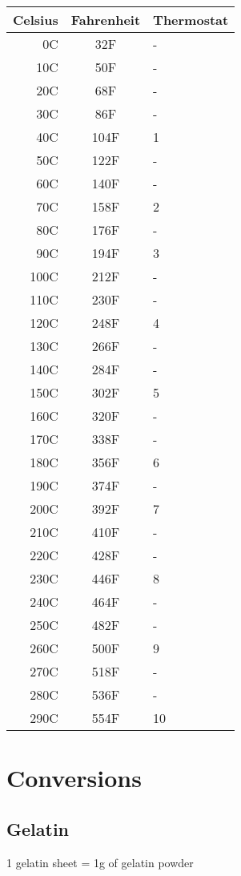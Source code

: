 \documentclass[10pt]{book}
\begin{document}
\begin{center}
\begin{tabular}{r c l}
Celsius & Fahrenheit & Thermostat \\
\hline
0C & 32F & - \\
10C & 50F & - \\
20C & 68F & - \\
30C & 86F & - \\
40C & 104F & 1 \\
50C & 122F & - \\
60C & 140F & - \\
70C & 158F & 2 \\
80C & 176F & - \\
90C & 194F & 3 \\
\hline
100C & 212F & - \\
110C & 230F & - \\
120C & 248F & 4 \\
130C & 266F & - \\
140C & 284F & - \\
150C & 302F & 5 \\
160C & 320F & - \\
170C & 338F & - \\
180C & 356F & 6 \\
190C & 374F & - \\
\hline
200C & 392F & 7 \\
210C & 410F & - \\
220C & 428F & - \\
230C & 446F & 8 \\
240C & 464F & - \\
250C & 482F & - \\
260C & 500F & 9 \\
270C & 518F & - \\
280C & 536F & - \\
290C & 554F & 10 \\
\end{tabular}
\end{center}

\newpage
\section*{Conversions}
\subsection*{Gelatin}
1 gelatin sheet = 1g of gelatin powder
\end{document}
